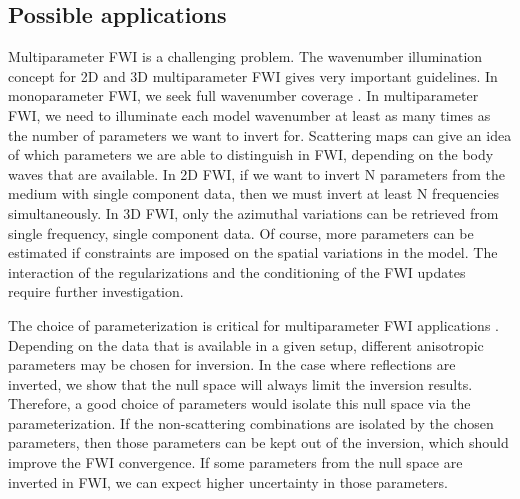 %

\subsection{Possible applications}
Multiparameter FWI is a challenging problem. The wavenumber illumination concept for 2D \citep{podgornova2018} and 3D \citep{kazei2018} multiparameter FWI gives very important guidelines. In monoparameter FWI, we seek full wavenumber coverage \citep{devaney1984, mora1989, operto2015, alkhalifah2016}. In multiparameter FWI, we need to illuminate each model wavenumber at least as many times as the number of parameters we want to invert for.
Scattering maps can give an idea of which parameters we are able to distinguish in FWI, depending on the body waves that are available.
In 2D FWI, if we want to invert N parameters from the medium with single component data, then we must invert at least N frequencies simultaneously. In 3D FWI, only the azimuthal variations can be retrieved from single frequency, single component data. Of course, more parameters can be estimated if constraints are imposed on the spatial variations in the model. The interaction of the regularizations \citep{esser2016, kazei2017c, kalita2018} and the conditioning of the FWI updates \citep{alkhalifah2014, ovcharenko2018} require further investigation.





The choice of parameterization is critical for multiparameter FWI applications \citep{tarantola1986, gholami2013, alkhalifah2014}. Depending on the data that is available in a given setup, different anisotropic parameters may be chosen for inversion. In the case where reflections are inverted, we show that the null space will always limit the inversion results. Therefore, a good choice of parameters would isolate this null space via the parameterization. If the non-scattering combinations are isolated by the chosen parameters, then those parameters can be kept out of the inversion, which should improve the FWI convergence.
If some parameters from the null space are inverted in FWI, we can expect higher uncertainty in those parameters.


